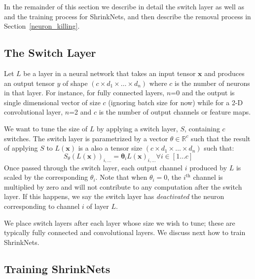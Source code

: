 In the remainder of this section we describe in detail the switch layer as well
as and the training process for ShrinkNets, and then describe the removal process in Section~\ref{neuron_killing}.

\subsection{The Switch Layer}

Let $L$ be a layer in a neural network that takes an input tensor $\bm{x}$ and
produces an output tensor $y$ of shape $\left(c \times d_1 \times \dots \times
d_n\right)$ where $c$ is the number of neurons in that layer.  For instance, for
fully connected layers, $n$=0 and the output is single dimensional vector of size $c$
(ignoring batch size for now) while for a 2-D convolutional layer, $n$=2 and $c$
is the number of output channels or feature maps.

We want to tune the size of $L$ by applying a switch layer, $S$, containing $c$
switches.  The switch
layer is parametrized by a vector $\theta \in \mathbb{R}^c$ such that the result
of applying $S$ to $L(\bm{x})$ is a also a tensor size $\left(c \times d_1
\times \dots \times d_n\right)$ such that: 
\begin{equation} 
S_{\theta}(L(\bm{x}))_{i,...} = \bm{\theta}_iL(\bm{x})_{i, ...} \forall i \in [1\ldots c]
\end{equation}
Once passed through the switch layer, each output channel $i$
produced by $L$ is scaled by the corresponding $\theta_i$. Note that when
$\theta_i = 0$, the $i^{\text{th}}$ channel is multiplied by zero and will not
contribute to any computation after the switch layer. If this happens, we say
the switch layer has {\it deactivated} the neuron corresponding to channel $i$ of layer $L$.

We place switch layers after each layer whose size we wish to tune; these are
typically fully connected and convolutional layers. We discuss next how to train
ShrinkNets.

\subsection{Training ShrinkNets} 


